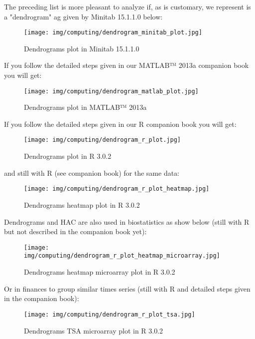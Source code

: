 	The preceding list is more pleasant to analyze if, as is customary, we represent is a "dendrogram" ag given by Minitab 15.1.1.0 below:	
	\begin{figure}[H]
		\centering
		\texttt{[image: img/computing/dendrogram\_minitab\_plot.jpg]}
		\caption{Dendrograms plot in Minitab 15.1.1.0}
	\end{figure}
	If you follow the detailed steps given in our MATLAB™ 2013a companion book you will get:
	\begin{figure}[H]
		\centering
		\texttt{[image: img/computing/dendrogram\_matlab\_plot.jpg]}
		\caption{Dendrograms plot in MATLAB™ 2013a }
	\end{figure}
	If you follow the detailed steps given in our R companion book you will get:
	\begin{figure}[H]
		\centering
		\texttt{[image: img/computing/dendrogram\_r\_plot.jpg]}
		\caption{Dendrograms plot in R 3.0.2}
	\end{figure}
	and still with R (see companion book) for the same data:
	\begin{figure}[H]
		\centering
		\texttt{[image: img/computing/dendrogram\_r\_plot\_heatmap.jpg]}
		\caption{Dendrograms heatmap plot in R 3.0.2}
	\end{figure}
	Dendrograms and HAC are also used in biostatistics as show below (still with R but not described in the companion book yet):
	\begin{figure}[H]
		\centering
		\texttt{[image: img/computing/dendrogram\_r\_plot\_heatmap\_microarray.jpg]}
		\caption{Dendrograms heatmap microarray plot in R 3.0.2}
	\end{figure}
	Or in finances to group similar times series (still with R and detailed steps given in the companion book):
	\begin{figure}[H]
		\centering
		\texttt{[image: img/computing/dendrogram\_r\_plot\_tsa.jpg]}
		\caption{Dendrograms TSA microarray plot in R 3.0.2}
	\end{figure}
	
	\pagebreak
